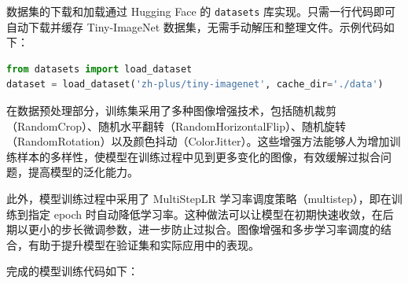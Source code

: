数据集的下载和加载通过 Hugging Face 的
\passthrough{\lstinline!datasets!}
库实现。只需一行代码即可自动下载并缓存 Tiny-ImageNet
数据集，无需手动解压和整理文件。示例代码如下：

\begin{lstlisting}[language=Python]
from datasets import load_dataset
dataset = load_dataset('zh-plus/tiny-imagenet', cache_dir='./data')
\end{lstlisting}

在数据预处理部分，训练集采用了多种图像增强技术，包括随机裁剪（RandomCrop）、随机水平翻转（RandomHorizontalFlip）、随机旋转（RandomRotation）以及颜色抖动（ColorJitter）。这些增强方法能够人为增加训练样本的多样性，使模型在训练过程中见到更多变化的图像，有效缓解过拟合问题，提高模型的泛化能力。

此外，模型训练过程中采用了 MultiStepLR
学习率调度策略（multistep），即在训练到指定 epoch
时自动降低学习率。这种做法可以让模型在初期快速收敛，在后期以更小的步长微调参数，进一步防止过拟合。图像增强和多步学习率调度的结合，有助于提升模型在验证集和实际应用中的表现。

完成的模型训练代码如下：

